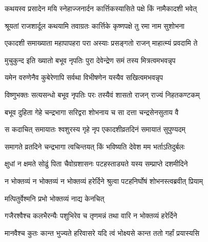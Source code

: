 \hyperref[sec:ekadashi_mahatmyam_padma_puranam]{\closesub}
\clearpage

\label{sec:padma-karttika-krishna-rama}

\ganapatyadiDhyanam
\padmaPuranam



\twolineshloka
{कथयस्व प्रसादेन मयि स्नेहाज्जनार्दन}
{कार्त्तिकस्यासिते पक्षे किं नामैकादशी भवेत्}%


\twolineshloka
{श्रूयतां राजशार्दूल कथयामि तवाग्रतः}
{कार्त्तिके कृष्णपक्षे तु रमा नाम सुशोभना}%

\twolineshloka
{एकादशी समाख्याता महापापहरा परा}
{अस्याः प्रसङ्गतो राजन् माहात्म्यं प्रवदामि ते}%

\twolineshloka
{मुचुकुन्द इति ख्यातो बभूव नृपतिः पुरा}
{देवेन्द्रेण समं तस्य मित्रत्वमभवन्नृप}%

\twolineshloka
{यमेन वरुणेनैव कुबेरेणापि सर्वथा}
{विभीषणेन यस्यैव सखित्वमभवन्नृप}%

\twolineshloka
{विष्णुभक्तः सत्यसन्धो बभूव नृपतिः परः}
{तस्यैवं शासतो राजन् राज्यं निहतकण्टकम्}%

\twolineshloka
{बभूव दुहिता गेहे चन्द्रभागा सरिद्वरा}
{शोभनाय च सा दत्ता चन्द्रसेनसुताय वै}%

\twolineshloka
{स कदाचित् समायातः श्वशुरस्य गृहे नृप}
{एकादशीव्रतदिनं समायातं सुपुण्यदम् }%

\twolineshloka
{समागते व्रतदिने चन्द्रभागा त्वचिन्तयत्}
{किं भविष्यति देवेश मम भर्ताऽतिदुर्बलः}%

\twolineshloka
{क्षुधां न क्षमते सोढुं पिता चैवोग्रशासनः}
{पटहस्ताड्यते यस्य सम्प्राप्ते दशमीदिने}%

\twolineshloka
{न भोक्तव्यं न भोक्तव्यं न भोक्तव्यं हरेर्दिने}
{श्रुत्वा पटहनिर्घोषं शोभनस्त्वब्रवीत् प्रियाम्}%

\onelineshloka
{मत्पितुर्वेश्मनि प्रभो भोक्तव्यं नाद्य केनचित्}%

\twolineshloka
{गजैरश्वैश्च कलभैरन्यैः पशुभिरेव  च}
{तृणमन्नं तथा वारि न भोक्तव्यं हरेर्दिने}%

\twolineshloka
{मानवैश्च कुतः कान्त भुज्यते हरिवासरे}
{यदि त्वं भोक्ष्यसे कान्त ततो गर्हां प्रयास्यसि}%

